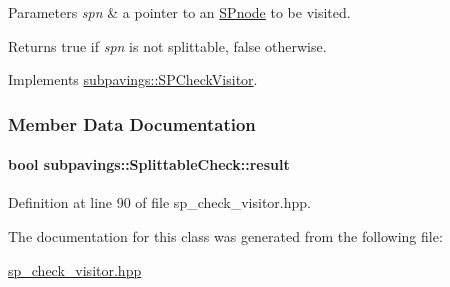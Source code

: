 \begin{DoxyParams}{\-Parameters}
{\em spn} & a pointer to an \hyperlink{classsubpavings_1_1SPnode}{\-S\-Pnode} to be visited. \\
\hline
\end{DoxyParams}
\begin{DoxyReturn}{\-Returns}
true if {\itshape spn\/} is not splittable, false otherwise. 
\end{DoxyReturn}


\-Implements \hyperlink{classsubpavings_1_1SPCheckVisitor_ad5fd0bde6d256676290e790c6387f01a}{subpavings\-::\-S\-P\-Check\-Visitor}.



\subsubsection{\-Member \-Data \-Documentation}
\hypertarget{classsubpavings_1_1SplittableCheck_aafe6ff513102db00eac0f1e5ed07e91c}{
\paragraph[{result}]{\setlength{\rightskip}{0pt plus 5cm}bool {\bf subpavings\-::\-Splittable\-Check\-::result}}}\label{classsubpavings_1_1SplittableCheck_aafe6ff513102db00eac0f1e5ed07e91c}


\-Definition at line 90 of file sp\-\_\-check\-\_\-visitor.\-hpp.



\-The documentation for this class was generated from the following file\-:\begin{DoxyCompactItemize}
\item 
\hyperlink{sp__check__visitor_8hpp}{sp\-\_\-check\-\_\-visitor.\-hpp}\end{DoxyCompactItemize}
